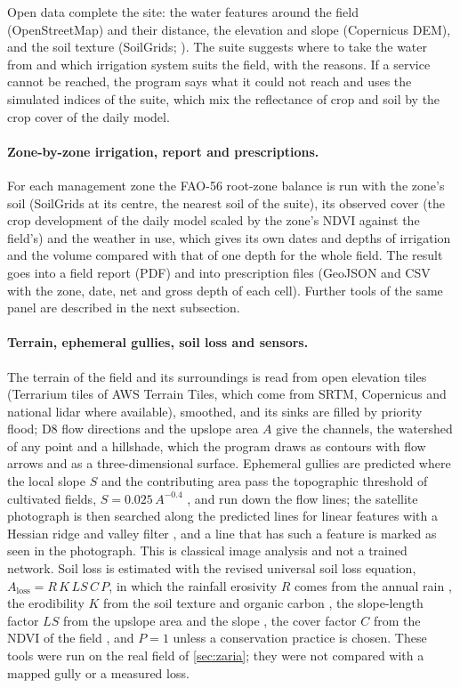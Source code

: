 Open data complete the site: the water features around the field (OpenStreetMap) and their distance, the elevation and slope (Copernicus DEM), and the soil texture (SoilGrids; \citealt{Poggio2021}). The suite suggests where to take the water from and which irrigation system suits the field, with the reasons. If a service cannot be reached, the program says what it could not reach and uses the simulated indices of the suite, which mix the reflectance of crop and soil by the crop cover of the daily model.

\paragraph{Zone-by-zone irrigation, report and prescriptions.}
For each management zone the FAO-56 root-zone balance \citep{Allen1998} is run with the zone's soil (SoilGrids at its centre, the nearest soil of the suite), its observed cover (the crop development of the daily model scaled by the zone's NDVI against the field's) and the weather in use, which gives its own dates and depths of irrigation and the volume compared with that of one depth for the whole field. The result goes into a field report (PDF) and into prescription files (GeoJSON and CSV with the zone, date, net and gross depth of each cell). Further tools of the same panel are described in the next subsection.

\paragraph{Terrain, ephemeral gullies, soil loss and sensors.}
The terrain of the field and its surroundings is read from open elevation tiles (Terrarium tiles of AWS Terrain Tiles, which come from SRTM, Copernicus and national lidar where available), smoothed, and its sinks are filled by priority flood; D8 flow directions and the upslope area $A$ give the channels, the watershed of any point and a hillshade, which the program draws as contours with flow arrows and as a three-dimensional surface. Ephemeral gullies are predicted where the local slope $S$ and the contributing area pass the topographic threshold of cultivated fields, $S=0.025\,A^{-0.4}$ \citep{Vandaele1996}, and run down the flow lines; the satellite photograph is then searched along the predicted lines for linear features with a Hessian ridge and valley filter \citep{Frangi1998}, and a line that has such a feature is marked as seen in the photograph. This is classical image analysis and not a trained network. Soil loss is estimated with the revised universal soil loss equation, $A_{\mathrm{loss}}=R\,K\,LS\,C\,P$, in which the rainfall erosivity $R$ comes from the annual rain \citep{Renard1994}, the erodibility $K$ from the soil texture and organic carbon \citep{Sharpley1990}, the slope-length factor $LS$ from the upslope area and the slope \citep{Moore1992}, the cover factor $C$ from the NDVI of the field \citep{vanderKnijff1999}, and $P=1$ unless a conservation practice is chosen. These tools were run on the real field of \cref{sec:zaria}; they were not compared with a mapped gully or a measured loss.

